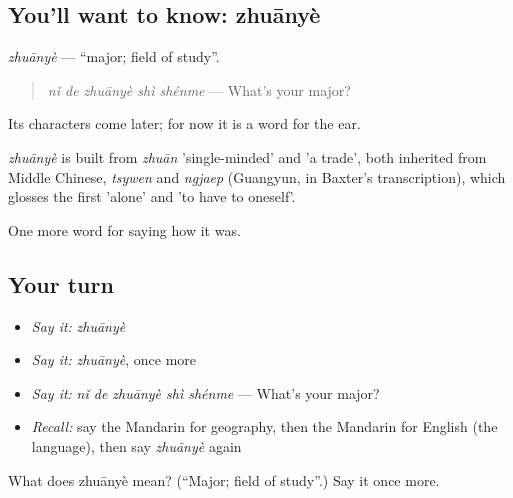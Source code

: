 \subsection*{You'll want to know: zhuānyè}
\emph{zhuānyè} — \textquotedblleft{}major; field of study\textquotedblright{}.

\begin{quote}
\emph{nǐ de zhuānyè shì shénme} — What's your major?
\end{quote}

Its characters come later; for now it is a word for the ear.

\begin{cousinweb}
\emph{zhuānyè} is built from \emph{zhuān} 'single-minded' and  'a trade', both inherited from Middle Chinese, \emph{tsywen} and \emph{ngjaep} (Guangyun, in Baxter's transcription), which glosses the first 'alone' and 'to have to oneself'.
\end{cousinweb}

\begin{grammarlens}[title={What you've built}]
One more word for saying how it was.
\end{grammarlens}

\subsection*{Your turn}
\begin{itemize}
\raggedright
  \item \emph{Say it:} \emph{zhuānyè}
  \item \emph{Say it:} \emph{zhuānyè}, once more
  \item \emph{Say it:} \emph{nǐ de zhuānyè shì shénme} — What's your major?
  \item \emph{Recall:} say the Mandarin for geography, then the Mandarin for English (the language), then say \emph{zhuānyè} again
\end{itemize}

\begin{tcolorbox}[breakable,colback=teal!4,colframe=teal!35!black,title={Before you move on}]
What does zhuānyè mean? (\textquotedblleft{}Major; field of study\textquotedblright{}.) Say it once more.
\end{tcolorbox}
